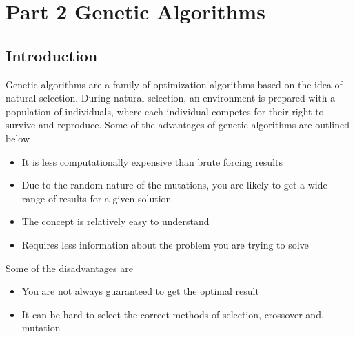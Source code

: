 \section{Part 2 Genetic Algorithms}

\subsection{Introduction}

Genetic algorithms are a family of optimization algorithms based on the idea of natural selection. During natural selection, an environment is prepared with a population of individuals, where each individual competes for their right to survive and reproduce. Some of the advantages of genetic algorithms are outlined below

\begin{itemize}
  \item It is less computationally expensive than brute forcing results
  \item Due to the random nature of the mutations, you are likely to get a wide range of results for a given solution
  \item The concept is relatively easy to understand
  \item Requires less information about the problem you are trying to solve
\end{itemize}

Some of the disadvantages are

\begin{itemize}
  \item You are not always guaranteed to get the optimal result
  \item It can be hard to select the correct methods of selection, crossover and, mutation
\end{itemize}